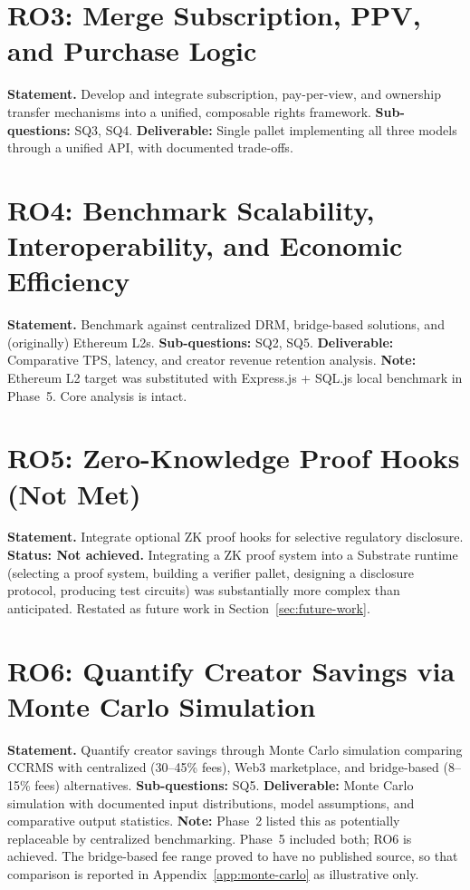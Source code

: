 \section{RO3: Merge Subscription, PPV, and Purchase Logic}

\textbf{Statement.} Develop and integrate subscription, pay-per-view, and ownership transfer mechanisms into a unified, composable rights framework.\newline
\textbf{Sub-questions:} SQ3, SQ4.\newline
\textbf{Deliverable:} Single pallet implementing all three models through a unified API, with documented trade-offs.

\section[RO4: Benchmark Scalability and Interoperability]{RO4: Benchmark Scalability, Interoperability, and Economic Efficiency}

\textbf{Statement.} Benchmark against centralized DRM, bridge-based solutions, and (originally) Ethereum L2s.\newline
\textbf{Sub-questions:} SQ2, SQ5.\newline
\textbf{Deliverable:} Comparative TPS, latency, and creator revenue retention analysis.\newline
\textbf{Note:} Ethereum L2 target was substituted with Express.js + SQL.js local benchmark in Phase~5. Core analysis is intact.

\section{RO5: Zero-Knowledge Proof Hooks (Not Met)}

\textbf{Statement.} Integrate optional ZK proof hooks for selective regulatory disclosure.\newline
\textbf{Status: Not achieved.} Integrating a ZK proof system into a Substrate runtime (selecting a proof system, building a verifier pallet, designing a disclosure protocol, producing test circuits) was substantially more complex than anticipated. Restated as future work in Section~\ref{sec:future-work}.

\section[RO6: Quantify Creator Savings]{RO6: Quantify Creator Savings via Monte Carlo Simulation}

\textbf{Statement.} Quantify creator savings through Monte Carlo simulation comparing CCRMS with centralized (30--45\% fees), Web3 marketplace, and bridge-based (8--15\% fees) alternatives.\newline
\textbf{Sub-questions:} SQ5.\newline
\textbf{Deliverable:} Monte Carlo simulation with documented input distributions, model assumptions, and comparative output statistics.\newline
\textbf{Note:} Phase~2 listed this as potentially replaceable by centralized benchmarking. Phase~5 included both; RO6 is achieved. The bridge-based fee range proved to have no published source, so that comparison is reported in Appendix~\ref{app:monte-carlo} as illustrative only.

